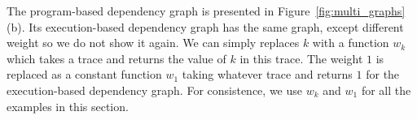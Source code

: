 \begin{example}
%

The program-based dependency graph is presented  in Figure~\ref{fig:multi_graphs}(b). Its execution-based dependency graph has the same graph, except different weight so we do not show it again. We can simply replaces $k$ with a function $w_k$ which takes a trace and returns the value of $k$ in this trace. The weight $1$ is replaced as a constant function $w_1$ taking whatever trace and returns $1$ for the execution-based dependency graph. For consistence, we use $w_k$ and $w_1$ for all the examples in this section.

\end{example}
